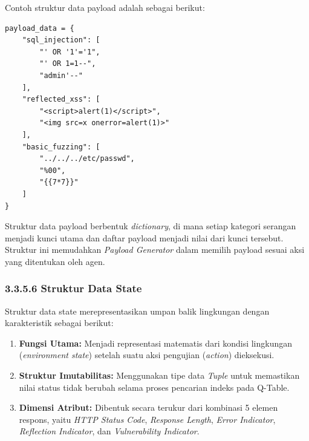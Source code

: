 Contoh struktur data payload adalah sebagai berikut:

\begin{verbatim}
payload_data = {
    "sql_injection": [
        "' OR '1'='1",
        "' OR 1=1--",
        "admin'--"
    ],
    "reflected_xss": [
        "<script>alert(1)</script>",
        "<img src=x onerror=alert(1)>"
    ],
    "basic_fuzzing": [
        "../../../etc/passwd",
        "%00",
        "{{7*7}}"
    ]
}
\end{verbatim}

Struktur data payload berbentuk \textit{dictionary}, di mana setiap kategori serangan menjadi kunci utama dan daftar payload menjadi nilai dari kunci tersebut. Struktur ini memudahkan \textit{Payload Generator} dalam memilih payload sesuai aksi yang ditentukan oleh agen.

\subsubsection{3.3.5.6 Struktur Data State}

Struktur data state merepresentasikan umpan balik lingkungan dengan karakteristik sebagai berikut:

\begin{enumerate}
    \item \textbf{Fungsi Utama:} Menjadi representasi matematis dari kondisi lingkungan (\textit{environment state}) setelah suatu aksi pengujian (\textit{action}) dieksekusi.
    \item \textbf{Struktur Imutabilitas:} Menggunakan tipe data \textit{Tuple} untuk memastikan nilai status tidak berubah selama proses pencarian indeks pada Q-Table.
    \item \textbf{Dimensi Atribut:} Dibentuk secara terukur dari kombinasi 5 elemen respons, yaitu \textit{HTTP Status Code}, \textit{Response Length}, \textit{Error Indicator}, \textit{Reflection Indicator}, dan \textit{Vulnerability Indicator}.
\end{enumerate}


